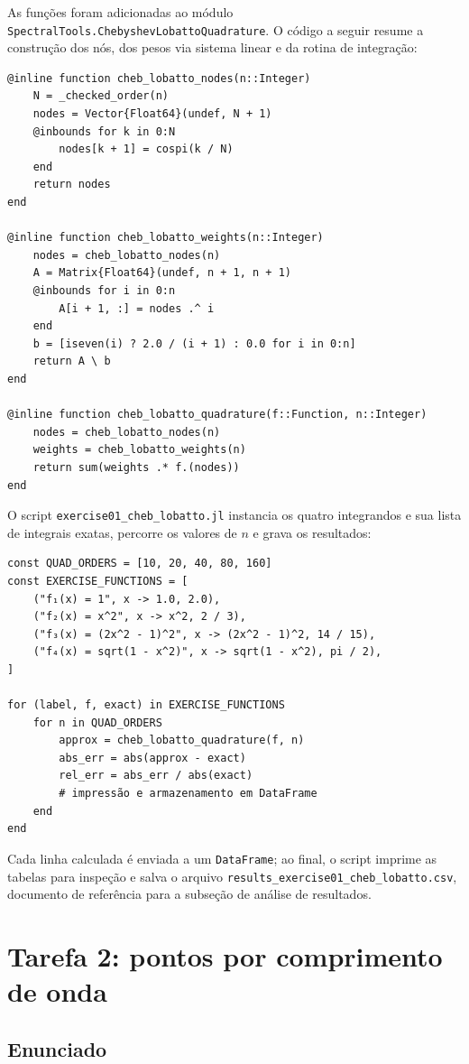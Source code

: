 \documentclass[12pt,a4paper]{article}
\begin{document}
As funções foram adicionadas ao módulo
\texttt{SpectralTools.ChebyshevLobattoQuadrature}. O código a seguir resume a
construção dos nós, dos pesos via sistema linear e da rotina de integração:

\begin{verbatim}
@inline function cheb_lobatto_nodes(n::Integer)
    N = _checked_order(n)
    nodes = Vector{Float64}(undef, N + 1)
    @inbounds for k in 0:N
        nodes[k + 1] = cospi(k / N)
    end
    return nodes
end

@inline function cheb_lobatto_weights(n::Integer)
    nodes = cheb_lobatto_nodes(n)
    A = Matrix{Float64}(undef, n + 1, n + 1)
    @inbounds for i in 0:n
        A[i + 1, :] = nodes .^ i
    end
    b = [iseven(i) ? 2.0 / (i + 1) : 0.0 for i in 0:n]
    return A \ b
end

@inline function cheb_lobatto_quadrature(f::Function, n::Integer)
    nodes = cheb_lobatto_nodes(n)
    weights = cheb_lobatto_weights(n)
    return sum(weights .* f.(nodes))
end
\end{verbatim}

O script \texttt{exercise01\_cheb\_lobatto.jl} instancia os quatro integrandos e
sua lista de integrais exatas, percorre os valores de $n$ e grava os resultados:

\begin{verbatim}
const QUAD_ORDERS = [10, 20, 40, 80, 160]
const EXERCISE_FUNCTIONS = [
    ("f₁(x) = 1", x -> 1.0, 2.0),
    ("f₂(x) = x^2", x -> x^2, 2 / 3),
    ("f₃(x) = (2x^2 - 1)^2", x -> (2x^2 - 1)^2, 14 / 15),
    ("f₄(x) = sqrt(1 - x^2)", x -> sqrt(1 - x^2), pi / 2),
]

for (label, f, exact) in EXERCISE_FUNCTIONS
    for n in QUAD_ORDERS
        approx = cheb_lobatto_quadrature(f, n)
        abs_err = abs(approx - exact)
        rel_err = abs_err / abs(exact)
        # impressão e armazenamento em DataFrame
    end
end
\end{verbatim}

Cada linha calculada é enviada a um \texttt{DataFrame}; ao final, o script imprime
as tabelas para inspeção e salva o arquivo
\texttt{results\_exercise01\_cheb\_lobatto.csv}, documento de referência para a
subseção de análise de resultados.


\section{Tarefa 2: pontos por comprimento de onda}

\subsection{Enunciado}
\end{document}
